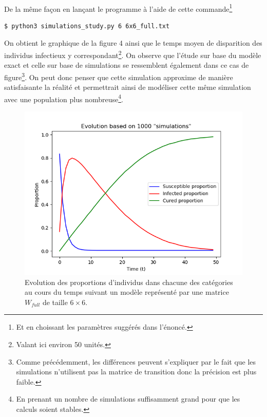 \documentclass[a4paper, 12pt, oneside]{article}
\begin{document}
\paragraph{}De la même façon en lançant le programme à l'aide de cette commande\footnote{Et en choissant les paramètres suggérés dans l'énoncé.}
\begin{lstlisting}[language=bash]
$ python3 simulations_study.py 6 6x6_full.txt 
\end{lstlisting}

\noindent On obtient le graphique de la figure 4 ainsi que le temps moyen de disparition des individus infectieux y correspondant\footnote{Valant ici environ 50 unités.}. On observe que l'étude sur base du modèle exact et celle sur base de simulations se ressemblent également dans ce cas de figure\footnote{Comme précédemment, les différences peuvent s'expliquer par le fait que les simulations n'utilisent pas la matrice de transition donc la précision est plus faible.}. On peut donc penser que cette simulation approxime de manière satisfaisante la réalité et permettrait ainsi de modéliser cette même simulation avec une population plus nombreuse\footnote{En prenant un nombre de simulations suffisamment grand pour que les calculs soient stables.}.

\begin{figure}[H]
	\centering
	\includegraphics[scale=1]{full_6x6_simulations.png} 
	\caption{Evolution des proportions d'individus dans chacune des catégories au cours du temps suivant un modèle représenté par une matrice $W_{full}$ de taille $6 \times 6$.}
\end{figure}
\end{document}
